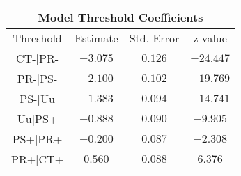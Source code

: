 \newline
\newline
\newline
\begin{minipage}{\linewidth}
\begin{tabular}{|c|c|c|c|}
\hline
\multicolumn{4}{|c|}{Model Threshold Coefficients}\\\hline
Threshold &  Estimate & Std. Error & z value\\\hline
CT-|PR- & $-3.075$ & $0.126$ &$-24.447$\\\hline
PR-|PS- & $-2.100$ & $0.102$ &$-19.769$\\\hline
PS-|Uu  & $-1.383$ & $0.094$ &$-14.741$\\\hline
Uu|PS+  & $-0.888$ & $0.090$ &$ -9.905$\\\hline
PS+|PR+ & $-0.200$ & $0.087$ &$ -2.308$\\\hline
PR+|CT+ & $ 0.560$ & $0.088$ &$  6.376$\\\hline
\end{tabular}
\end{minipage}

